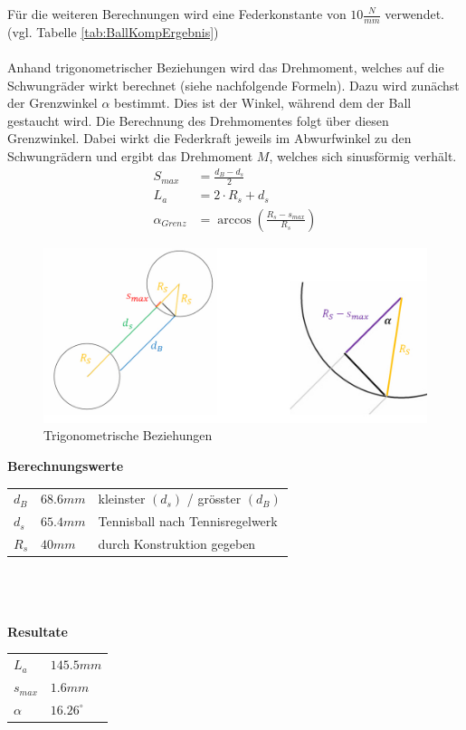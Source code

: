 Für die weiteren Berechnungen wird eine Federkonstante von $10 \frac{N}{mm}$ 
verwendet. (vgl. Tabelle \ref{tab:BallKompErgebnis})\\
\\
Anhand trigonometrischer Beziehungen wird das Drehmoment, welches auf die 
Schwungräder wirkt berechnet (siehe nachfolgende Formeln). Dazu wird zunächst 
der Grenzwinkel $\alpha$ bestimmt. Dies ist der Winkel, während dem der Ball 
gestaucht wird. Die Berechnung des Drehmomentes folgt über diesen Grenzwinkel. 
Dabei wirkt die Federkraft jeweils im Abwurfwinkel zu den Schwungrädern und 
ergibt das Drehmoment $M$, welches sich sinusförmig verhält. 
%
\begin{align}  
    S_{max} &= \frac{d_B - d_s}{2}\\
    L_a &= 2 \cdot R_s + d_s\\
    \alpha_{Grenz} &= \arccos\left(\frac{R_s - s_{max}}{R_s}\right)
\end{align}

\begin{figure}[h!]
	\centering
	\includegraphics[width=1\textwidth]{Enddokumentation/Anhang/Bilder/TrigoBeziehungen.jpg}
	\caption{Trigonometrische Beziehungen}
	\label{fig:trigoBeziehungen}
\end{figure}
\textbf{Berechnungswerte}\\
\begin{tabular}{lll}
	\rule{0pt}{11pt} $d_B$ & $68.6 mm$ & kleinster $(d_s)$ / grösster $(d_B)$ \\
	\rule{0pt}{11pt} $d_s$ & $65.4 mm$ & Tennisball nach Tennisregelwerk \\
	\rule{0pt}{11pt} $R_s$ & $40 mm$ & durch Konstruktion gegeben \\
\end{tabular}\\
\\
\\
\textbf{Resultate}\\
\begin{tabular}{ll}
	\rule{0pt}{11pt} $L_a$ & $145.5 mm$ \\
	\rule{0pt}{11pt} $s_{max}$ & $1.6 mm$ \\
	\rule{0pt}{11pt} $\alpha$ & $16.26^\circ$ \\
\end{tabular}

